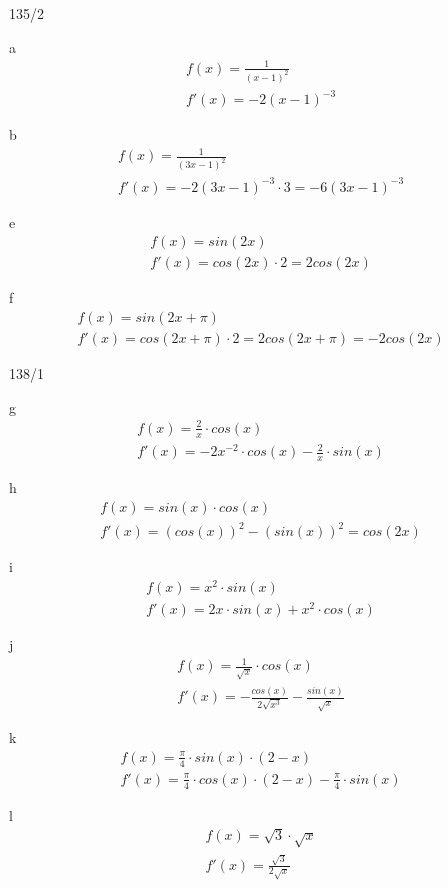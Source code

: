 \begin{exercise}{135/2}
  \item [a]
  \begin{gather*}
    f(x) = \frac{1}{(x - 1)^2} \\
    f'(x) = -2(x - 1)^{-3}
  \end{gather*}
  \item [b]
  \begin{gather*}
    f(x) = \frac{1}{(3x - 1)^2} \\
    f'(x) = -2(3x - 1)^{-3} \cdot 3 = -6(3x - 1)^{-3}
  \end{gather*}
  \item [e]
  \begin{gather*}
    f(x) = sin(2x) \\
    f'(x) = cos(2x) \cdot 2 = 2cos(2x)
  \end{gather*}
  \item [f]
  \begin{gather*}
    f(x) = sin(2x + \pi) \\
    f'(x) = cos(2x + \pi) \cdot 2 = 2cos(2x + \pi) = -2cos(2x)
  \end{gather*}
\end{exercise}
\begin{exercise}{138/1}
  \item [g]
  \begin{gather*}
    f(x) = \frac{2}{x} \cdot cos(x) \\
    f'(x) = -2x^{-2} \cdot cos(x) - \frac{2}{x} \cdot sin(x)
  \end{gather*}
  \item [h]
  \begin{gather*}
    f(x) = sin(x) \cdot cos(x) \\
    f'(x) = (cos(x))^2 - (sin(x))^2 = cos(2x)
  \end{gather*}
  \item [i]
  \begin{gather*}
    f(x) = x^2 \cdot sin(x) \\
    f'(x) = 2x \cdot sin(x) + x^2 \cdot cos(x)
  \end{gather*}
  \item [j]
  \begin{gather*}
    f(x) = \frac{1}{\sqrt{x}} \cdot cos(x) \\
    f'(x) = -\frac{cos(x)}{2\sqrt{x^3}} - \frac{sin(x)}{\sqrt{x}}
  \end{gather*}
  \item [k]
  \begin{gather*}
    f(x) = \frac{\pi}{4} \cdot sin(x) \cdot (2 - x) \\
    f'(x) = \frac{\pi}{4} \cdot cos(x) \cdot (2 - x) - \frac{\pi}{4} \cdot sin(x)
  \end{gather*}
  \item [l]
  \begin{gather*}
    f(x) = \sqrt{3} \cdot \sqrt{x} \\
    f'(x) = \frac{\sqrt{3}}{2\sqrt{x}}
  \end{gather*}
\end{exercise}
